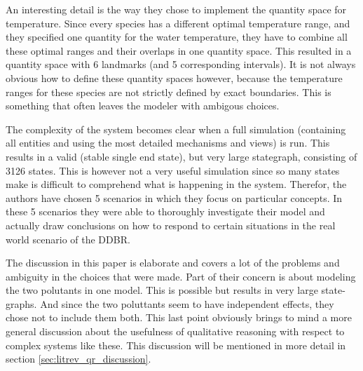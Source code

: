 \documentclass{article} %
\begin{document}
An interesting detail is the way they chose to implement the quantity space for
temperature. Since every species has a different optimal temperature range, and
they specified one quantity for the water temperature, they have to combine all
these optimal ranges and their overlaps in one quantity space. This resulted in
a quantity space with 6 landmarks (and 5 corresponding intervals). It is not
always obvious how to define these quantity spaces however, because the
temperature ranges for these species are not strictly defined by exact
boundaries. This is something that often leaves the modeler with ambigous
choices.

\vspace{0.8 em}

The complexity of the system becomes clear when a full simulation (containing all
entities and using the most detailed mechanisms and views) is run. This results
in a valid (stable single end state), but very large stategraph, consisting of
3126 states. This is however not a very useful simulation since so many states
make is difficult to comprehend what is happening in the system. Therefor, the
authors have chosen 5 scenarios in which they focus on particular concepts. In
these 5 scenarios they were able to thoroughly investigate their model and
actually draw conclusions on how to respond to certain situations in the real 
world scenario of the DDBR.

\vspace{0.8em}

The discussion in this paper is elaborate and covers a lot of the problems and
ambiguity in the choices that were made. Part of their concern is about modeling
the two polutants in one model. This is possible but results in very large
state-graphs. And since the two poluttants seem to have independent effects,
they chose not to include them both.
This last point obviously brings to mind a more general discussion about the
usefulness of qualitative reasoning with respect to complex systems like these.
This discussion will be mentioned in more detail in section
\ref{sec:litrev_qr_discussion}.

\end{document}
